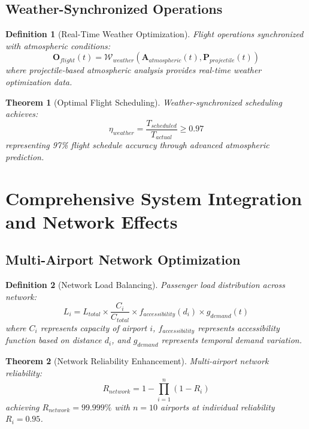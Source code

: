 \documentclass[12pt,a4paper]{article}
\newtheorem{theorem}{Theorem}
\newtheorem{definition}{Definition}
\begin{document}
\subsection{Weather-Synchronized Operations}

\begin{definition}[Real-Time Weather Optimization]
Flight operations synchronized with atmospheric conditions:
\begin{equation}
\mathbf{O}_{flight}(t) = \mathcal{W}_{weather}(\mathbf{A}_{atmospheric}(t), \mathbf{P}_{projectile}(t))
\end{equation}
where projectile-based atmospheric analysis provides real-time weather optimization data.
\end{definition}

\begin{theorem}[Optimal Flight Scheduling]
Weather-synchronized scheduling achieves:
\begin{equation}
\eta_{weather} = \frac{T_{scheduled}}{T_{actual}} \geq 0.97
\end{equation}
representing 97\% flight schedule accuracy through advanced atmospheric prediction.
\end{theorem}

\section{Comprehensive System Integration and Network Effects}

\subsection{Multi-Airport Network Optimization}

\begin{definition}[Network Load Balancing]
Passenger load distribution across network:
\begin{equation}
L_i = L_{total} \times \frac{C_i}{C_{total}} \times f_{accessibility}(d_i) \times g_{demand}(t)
\end{equation}
where $C_i$ represents capacity of airport $i$, $f_{accessibility}$ represents accessibility function based on distance $d_i$, and $g_{demand}$ represents temporal demand variation.
\end{definition}

\begin{theorem}[Network Reliability Enhancement]
Multi-airport network reliability:
\begin{equation}
R_{network} = 1 - \prod_{i=1}^n (1 - R_i)
\end{equation}
achieving $R_{network} = 99.999\%$ with $n = 10$ airports at individual reliability $R_i = 0.95$.
\end{theorem}
\end{document}
